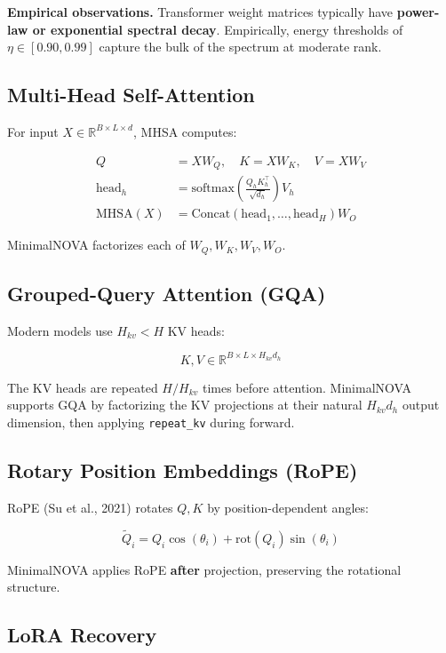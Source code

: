 \textbf{Empirical observations.} Transformer weight matrices typically have 
\textbf{power-law or exponential spectral decay}. Empirically, energy thresholds 
of $\eta \in [0.90, 0.99]$ capture the bulk of the spectrum at moderate rank.

\subsection{Multi-Head Self-Attention}

For input $X \in \mathbb{R}^{B \times L \times d}$, MHSA computes:

\[
\begin{aligned}
Q &= X W_Q, \quad K = X W_K, \quad V = X W_V \\
\text{head}_h &= \text{softmax}\!\left(\frac{Q_h K_h^\top}{\sqrt{d_h}}\right) V_h \\
\text{MHSA}(X) &= \text{Concat}(\text{head}_1, \dots, \text{head}_H) W_O
\end{aligned}
\tag{3.7}
\]

MinimalNOVA factorizes each of $W_Q, W_K, W_V, W_O$.

\subsection{Grouped-Query Attention (GQA)}

Modern models use $H_{kv} < H$ KV heads:

\[
K, V \in \mathbb{R}^{B \times L \times H_{kv} d_h}
\tag{3.8}
\]

The KV heads are repeated $H/H_{kv}$ times before attention. MinimalNOVA 
supports GQA by factorizing the KV projections at their natural 
$H_{kv} d_h$ output dimension, then applying \texttt{repeat\_kv} during forward.

\subsection{Rotary Position Embeddings (RoPE)}

RoPE (Su et al., 2021) rotates $Q, K$ by position-dependent angles:

\[
\tilde{Q}_i = Q_i \cos(\theta_i) + \text{rot}(Q_i) \sin(\theta_i)
\tag{3.9}
\]

MinimalNOVA applies RoPE \textbf{after} projection, preserving the rotational 
structure.

\subsection{LoRA Recovery}

